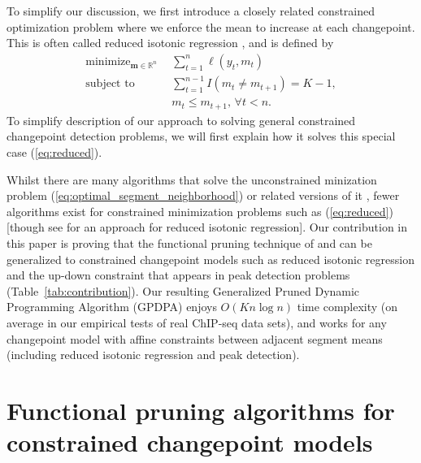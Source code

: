 \documentclass[aoas]{imsart}
\DeclareMathOperator*{\minimize}{minimize}
\newcommand{\RR}{\mathbb R}
\begin{document}
To simplify our discussion, we first introduce a closely related
constrained optimization problem where we enforce the mean to increase
at each changepoint. This is often called reduced isotonic regression
\citep{reduced-monotonic-regression}, and is defined by
\begin{align}
  \label{eq:reduced}
  \minimize_{\mathbf m\in\RR^n} &\ \ 
  \sum_{t=1}^n \ell(y_t, m_t)\\
  \text{subject to} &\ \  \sum_{t=1}^{n-1} I(m_t \neq m_{t+1}) = K-1,
  \nonumber\\
  &\ \  m_t \leq m_{t+1},\, \forall t<n.
  \nonumber 
\end{align}
To simplify description of our approach to solving general constrained
changepoint detection problems, we will first explain how it solves
this special case (\ref{eq:reduced}).


Whilst there are many algorithms that solve the unconstrained
minization problem (\ref{eq:optimal_segment_neighborhood})
\citep{segment-neighborhood,pruned-dp,phd-johnson} or related versions
of it \citep{optimal-partitioning,pelt,fpop,flsa}, fewer algorithms
exist for constrained minimization problems such as (\ref{eq:reduced})
[though see \citet{hardwick2014optimal} for an approach
for reduced isotonic regression]. Our contribution in this paper is
proving that the functional pruning technique of \citet{pruned-dp} and
\citet{fpop} can be generalized to constrained changepoint models such
as reduced isotonic regression and the up-down constraint that
appears in peak detection problems (Table~\ref{tab:contribution}). Our
resulting Generalized Pruned Dynamic Programming Algorithm (GPDPA)
enjoys $O(Kn\log n)$ time complexity (on average in our empirical
tests of real ChIP-seq data sets), and works for any changepoint model
with affine constraints between adjacent segment means (including
reduced isotonic regression and peak detection).

\newcommand{\FCC}{C}
\newcommand{\M}{\mathcal{M}}
\section{Functional 
pruning algorithms for constrained
  changepoint models}
\label{sec:algorithms}


\end{document}
